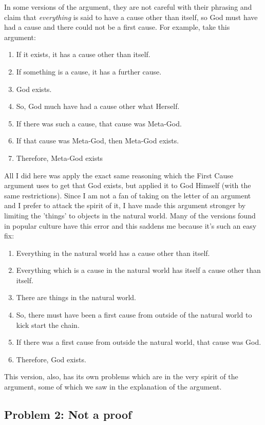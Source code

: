 In some versions of the argument, they are not careful with their phrasing and claim that \emph{everything} is said to have a cause other than itself, so God must have had a cause and there could not be a first cause. For example, take this argument:
\begin{enumerate}
   \item If it exists, it has a cause other than itself.
   \item If something is a cause, it has a further cause.
   \item God exists.
   \item So, God much have had a cause other what Herself.
   \item If there was such a cause, that cause was Meta-God.
    \item If that cause was Meta-God, then Meta-God exists.
    \item Therefore, Meta-God exists
\end{enumerate}
All I did here was apply the exact same reasoning which the First Cause argument uses to get that God exists, but applied it to God Himself (with the same restrictions). Since I am not a fan of taking on the letter of an argument and I prefer to attack the spirit of it, I have made this argument stronger by limiting the 'things' to objects in the natural world.  Many of the versions found in popular culture have this error and this saddens me because it's such an easy fix:
\begin{enumerate}
    \item Everything in the natural world has a cause other than itself.
    \item Everything which is a cause in the natural world has itself a cause other than itself.
    \item There are things in the natural world.
    \item So, there must have been a first cause from outside of the natural world to kick start the chain.
    \item If there was a first cause from outside the natural world, that cause was God.
    \item Therefore, God exists.
\end{enumerate}
This version, also, has its own problems which are in the very spirit of the argument, some of which we saw in the explanation of the argument.
\subsection{Problem 2: Not a proof}

